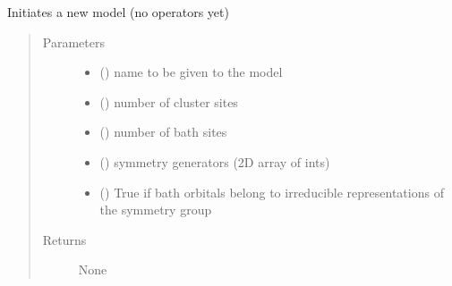 \documentclass[letterpaper,10pt,english]{sphinxmanual}
\begin{document}
\begin{fulllineitems}
\label{\detokenize{functions:pyqcm.new_cluster_model}}
\sphinxAtStartPar
Initiates a new model (no operators yet)
\begin{quote}\begin{description}
\item[{Parameters}] \leavevmode\begin{itemize}
\item {} 
\sphinxAtStartPar
{} () \textendash{} name to be given to the model

\item {} 
\sphinxAtStartPar
{} () \textendash{} number of cluster sites

\item {} 
\sphinxAtStartPar
{} () \textendash{} number of bath sites

\item {} 
\sphinxAtStartPar
{} (\sphinxstyleliteralemphasis{\sphinxupquote{{[}}}\sphinxstyleliteralemphasis{\sphinxupquote{{[}}}\sphinxstyleliteralemphasis{\sphinxupquote{{]}}}\sphinxstyleliteralemphasis{\sphinxupquote{{]}}}) \textendash{} symmetry generators (2D array of ints)

\item {} 
\sphinxAtStartPar
{} (\sphinxstyleliteralemphasis{\sphinxupquote{{[}}}\sphinxstyleliteralemphasis{\sphinxupquote{{]}}}) \textendash{} True if bath orbitals belong to irreducible representations of the symmetry group

\end{itemize}

\item[{Returns}] \leavevmode
\sphinxAtStartPar
None

\end{description}\end{quote}

\end{fulllineitems}
\end{document}
